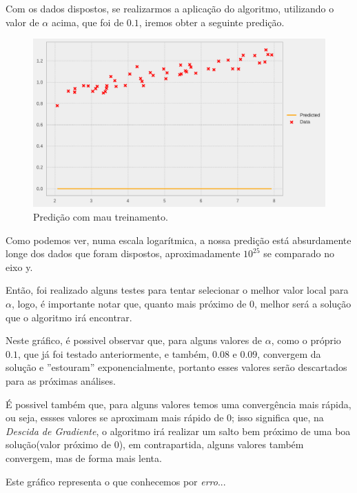 \documentclass[a4paper, 12pt]{article}
\begin{document}
Com os dados dispostos, se realizarmos a aplicação do algoritmo, utilizando o valor de $\alpha$ acima, que foi de
$0.1$, iremos obter a seguinte predição.
\begin{figure}[!h]
    \centering
    \includegraphics[width=1\textwidth]{../imgs/first_predicted.pdf}
    \caption{Predição com mau treinamento.}
    \label{fig:data}
\end{figure}

Como podemos ver, numa escala logarítmica, a nossa predição está absurdamente longe dos dados que foram
dispostos, aproximadamente $10^{25}$ se comparado no eixo y.
\clearpage

Então, foi realizado alguns testes para tentar selecionar o melhor valor local para $\alpha$, logo, é importante
notar que, quanto mais próximo de $0$, melhor será a solução que o algoritmo irá encontrar. 

Neste gráfico, é possivel observar que, para alguns valores de $\alpha$, como o próprio $0.1$, que já foi testado anteriormente, e também,
$0.08$ e $0.09$, convergem da solução e ''estouram'' exponencialmente, portanto esses valores serão descartados para as próximas análises.

É possivel também que, para alguns valores temos uma convergência mais rápida, ou seja, essses valores se aproximam mais rápido de $0$; isso significa que, na \textit{Descida de Gradiente}, o algoritmo irá realizar
um salto bem próximo de uma boa solução(valor próximo de $0$), em contrapartida, alguns valores também convergem, mas de forma mais lenta.

Este gráfico representa o que conhecemos por \textit{erro}...
\end{document}
